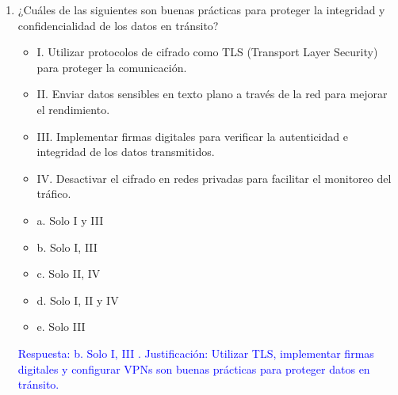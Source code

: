 \documentclass[a4paper]{article}
\begin{document}
\begin{enumerate}
    \item ¿Cuáles de las siguientes son buenas prácticas para proteger la integridad y confidencialidad de los datos en tránsito?
    \begin{itemize}
        \item I. Utilizar protocolos de cifrado como TLS (Transport Layer Security) para proteger la comunicación.
        \item II. Enviar datos sensibles en texto plano a través de la red para mejorar el rendimiento.
        \item III. Implementar firmas digitales para verificar la autenticidad e integridad de los datos transmitidos.
        \item IV. Desactivar el cifrado en redes privadas para facilitar el monitoreo del tráfico.
    \end{itemize}
    \begin{itemize}
        \item a. Solo I y III
        \item b. Solo I, III 
        \item c. Solo II, IV 
        \item d. Solo I, II y IV
        \item e. Solo III 
    \end{itemize}
    \textcolor{blue}{Respuesta: b. Solo I, III . Justificación: Utilizar TLS, implementar firmas digitales y configurar VPNs son buenas prácticas para proteger datos en tránsito.}
    \vspace{1cm}

\end{enumerate}
\end{document}
